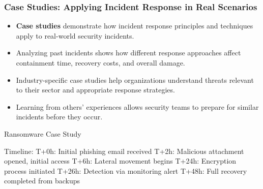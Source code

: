 \documentclass{beamer}
\begin{document}
\begin{frame}[fragile]
\frametitle{Case Studies: Applying Incident Response in Real Scenarios}
\begin{itemize}
\item \textbf{Case studies} demonstrate how incident response principles and techniques apply to real-world security incidents.
\item Analyzing past incidents shows how different response approaches affect containment time, recovery costs, and overall damage.
\item Industry-specific case studies help organizations understand threats relevant to their sector and appropriate response strategies.
\item Learning from others' experiences allows security teams to prepare for similar incidents before they occur.
\end{itemize}

\begin{exampleblock}{Ransomware Case Study}
\scriptsize
\begin{semiverbatim}
Timeline:
T+0h: Initial phishing email received
T+2h: Malicious attachment opened, initial access
T+6h: Lateral movement begins
T+24h: Encryption process initiated
T+26h: Detection via monitoring alert
T+48h: Full recovery completed from backups
\end{semiverbatim}
\end{exampleblock}
\end{frame}
\end{document}
